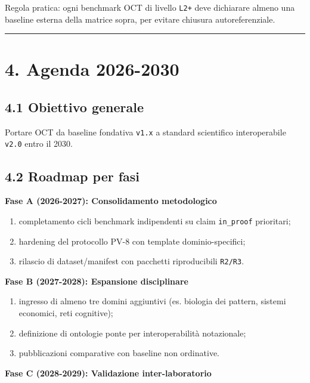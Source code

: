 Regola pratica:
ogni benchmark OCT di livello \texttt{L2+} deve dichiarare almeno una baseline esterna della matrice sopra, per evitare chiusura autoreferenziale.

\begin{center}\rule{0.5\linewidth}{0.5pt}\end{center}

\section{4. Agenda 2026-2030}

\subsection{4.1 Obiettivo generale}

Portare OCT da baseline fondativa \texttt{v1.x} a standard scientifico interoperabile \texttt{v2.0} entro il 2030.

\subsection{4.2 Roadmap per fasi}

\textbf{Fase A (2026-2027): Consolidamento metodologico}

\begin{enumerate}
\def\labelenumi{\arabic{enumi}.}
\tightlist
\item
  completamento cicli benchmark indipendenti su claim \texttt{in\_proof} prioritari;
\item
  hardening del protocollo PV-8 con template dominio-specifici;
\item
  rilascio di dataset/manifest con pacchetti riproducibili \texttt{R2/R3}.
\end{enumerate}

\textbf{Fase B (2027-2028): Espansione disciplinare}

\begin{enumerate}
\def\labelenumi{\arabic{enumi}.}
\tightlist
\item
  ingresso di almeno tre domini aggiuntivi (es. biologia dei pattern, sistemi economici, reti cognitive);
\item
  definizione di ontologie ponte per interoperabilità notazionale;
\item
  pubblicazioni comparative con baseline non ordinative.
\end{enumerate}

\textbf{Fase C (2028-2029): Validazione inter-laboratorio}

